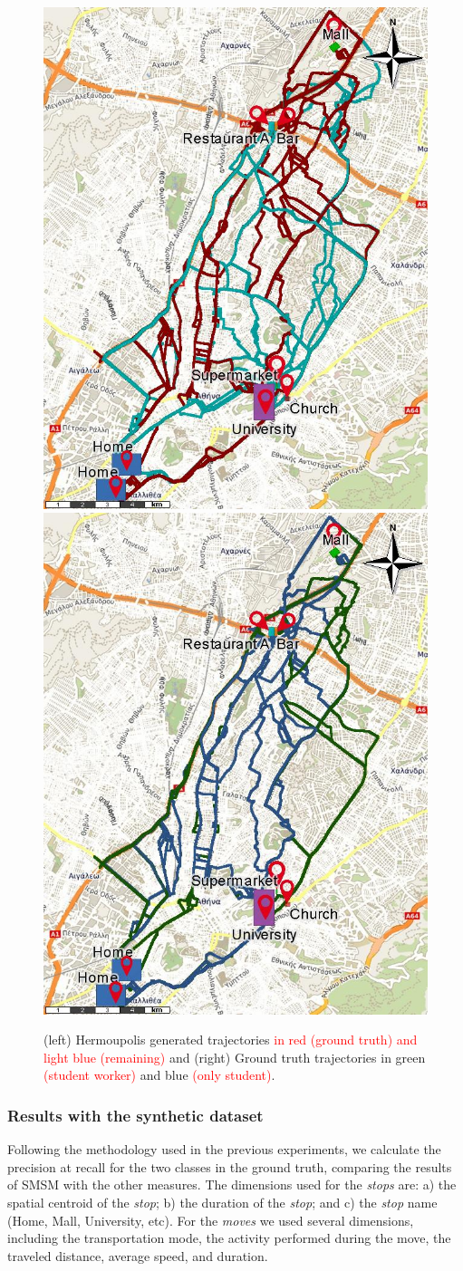 \documentclass[12pt]{article}
\begin{document}
\begin{figure}[ht!]
\centerline{
\centering
\includegraphics[width=.5\textwidth]{Images/Hermoupolis-RawPoints.jpg}
\includegraphics[width=.5\textwidth]{Images/Hermoupolis-CommercialCenter.jpg}
}
\caption{(left) Hermoupolis generated trajectories \textcolor{Red}{ in red (ground truth) and light blue (remaining)} and (right) Ground truth trajectories in green \textcolor{Red}{(student worker)} and blue \textcolor{Red}{(only student)}.}
\label{fig:hermoupolis_groundtruth}
\end{figure}

\subsubsection{Results with the synthetic dataset}
Following the methodology used in the previous experiments, we calculate the precision at recall for the two classes in the ground truth, comparing the results of SMSM with the other measures. The dimensions used for the \emph{stops} are: a) the spatial centroid of the \emph{stop}; b) the duration of the \emph{stop}; and c) the \emph{stop} name (Home, Mall, University, etc). For the \emph{moves} we used several dimensions, including  the transportation mode, the activity performed during the move, the traveled distance, average speed, and  duration.
\end{document}
